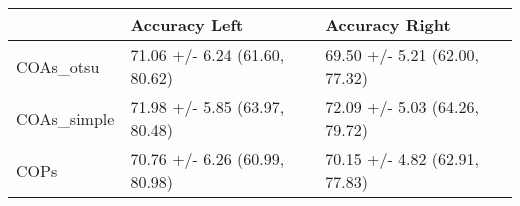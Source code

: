 \begin{tabular}{lll}
\toprule
{} &                  Accuracy Left &                 Accuracy Right \\
\midrule
COAs\_otsu   &  71.06 +/- 6.24 (61.60, 80.62) &  69.50 +/- 5.21 (62.00, 77.32) \\
COAs\_simple &  71.98 +/- 5.85 (63.97, 80.48) &  72.09 +/- 5.03 (64.26, 79.72) \\
COPs        &  70.76 +/- 6.26 (60.99, 80.98) &  70.15 +/- 4.82 (62.91, 77.83) \\
\bottomrule
\end{tabular}
